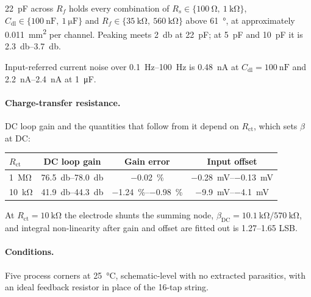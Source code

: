 \SI{22}{\pico\farad} across $R_f$ holds every combination of
$R_s \in \{\SI{100}{\ohm},\ \SI{1}{\kilo\ohm}\}$,
$C_{\mathrm{dl}} \in \{\SI{100}{\nano\farad},\ \SI{1}{\micro\farad}\}$ and
$R_f \in \{\SI{35}{\kilo\ohm},\ \SI{560}{\kilo\ohm}\}$ above \SI{61}{\degree}, at
approximately \SI{0.011}{\milli\metre\squared} per channel. Peaking meets
\SI{2}{\decibel} at \SI{22}{\pico\farad}; at \SI{5}{\pico\farad} and
\SI{10}{\pico\farad} it is \SIrange{2.3}{3.7}{\decibel}.

Input-referred current noise over \SIrange{0.1}{100}{\hertz} is
\SI{0.48}{\nano\ampere} at $C_{\mathrm{dl}} = \SI{100}{\nano\farad}$ and
\SIrange{2.2}{2.4}{\nano\ampere} at \SI{1}{\micro\farad}.

\paragraph{Charge-transfer resistance.} DC loop gain and the quantities that follow from
it depend on $R_{\mathrm{ct}}$, which sets $\beta$ at DC:

\begin{center}
\begin{tabular}{lccc}
\toprule
$R_{\mathrm{ct}}$ & DC loop gain & Gain error & Input offset \\
\midrule
\SI{1}{\mega\ohm}   & \SIrange{76.5}{78.0}{\decibel} & \SI{-0.02}{\percent}                & \SIrange{-0.28}{-0.13}{\milli\volt} \\
\SI{10}{\kilo\ohm}  & \SIrange{41.9}{44.3}{\decibel} & \SIrange{-1.24}{-0.98}{\percent}    & \SIrange{-9.9}{-4.1}{\milli\volt}   \\
\bottomrule
\end{tabular}
\end{center}

At $R_{\mathrm{ct}} = \SI{10}{\kilo\ohm}$ the electrode shunts the summing node,
$\beta_{\mathrm{DC}} = \SI{10.1}{\kilo\ohm}/\SI{570}{\kilo\ohm}$, and integral
non-linearity after gain and offset are fitted out is \SIrange{1.27}{1.65}{} LSB.

\paragraph{Conditions.} Five process corners at \SI{25}{\celsius}, schematic-level with
no extracted parasitics, with an ideal feedback resistor in place of the 16-tap string.
